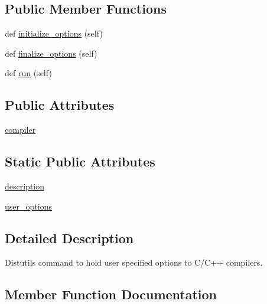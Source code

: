 \subsection*{Public Member Functions}
\begin{DoxyCompactItemize}
\item 
def \hyperlink{classnumpy_1_1distutils_1_1command_1_1config__compiler_1_1config__cc_a02998e818d582e5373997b1ba9e0c6fb}{initialize\+\_\+options} (self)
\item 
def \hyperlink{classnumpy_1_1distutils_1_1command_1_1config__compiler_1_1config__cc_a72efc2c8be6a2c6337cb2baa02760c40}{finalize\+\_\+options} (self)
\item 
def \hyperlink{classnumpy_1_1distutils_1_1command_1_1config__compiler_1_1config__cc_a5cd6fbcaa26502b0920733bd2679ed3a}{run} (self)
\end{DoxyCompactItemize}
\subsection*{Public Attributes}
\begin{DoxyCompactItemize}
\item 
\hyperlink{classnumpy_1_1distutils_1_1command_1_1config__compiler_1_1config__cc_ab060ab635d98d3cfa1f08ac15e7f2401}{compiler}
\end{DoxyCompactItemize}
\subsection*{Static Public Attributes}
\begin{DoxyCompactItemize}
\item 
\hyperlink{classnumpy_1_1distutils_1_1command_1_1config__compiler_1_1config__cc_a092917a88a5d2865a6dd0276fef96f90}{description}
\item 
\hyperlink{classnumpy_1_1distutils_1_1command_1_1config__compiler_1_1config__cc_a9d5c5c3feb7c436082904de4d52d3ef2}{user\+\_\+options}
\end{DoxyCompactItemize}


\subsection{Detailed Description}
\begin{DoxyVerb}Distutils command to hold user specified options
to C/C++ compilers.
\end{DoxyVerb}
 

\subsection{Member Function Documentation}
\mbox{\label{classnumpy_1_1distutils_1_1command_1_1config__compiler_1_1config__cc_a72efc2c8be6a2c6337cb2baa02760c40}} 
